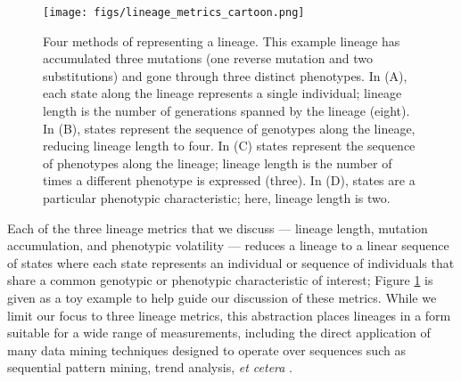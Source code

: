 \documentclass[letterpaper]{article}
\newcommand{\reduceCaptionPadding}{\setlength{\belowcaptionskip}{-10pt}}
\begin{document}
\begin{figure}[t]
\texttt{[image: figs/lineage\_metrics\_cartoon.png]}
\reduceCaptionPadding
\caption{\small Four methods of representing a lineage.  This example lineage has accumulated three mutations (one reverse mutation and two substitutions) and gone through three distinct phenotypes. In (A), each state along the lineage represents a single individual; lineage length is the number of generations spanned by the lineage (eight). In (B), states represent the sequence of genotypes along the lineage, reducing lineage length to four. In (C) states represent the sequence of phenotypes along the lineage; lineage length is the number of times a different phenotype is expressed (three). In (D), states are a particular phenotypic characteristic; here, lineage length is two.}
\label{fig:lineage_metrics_cartoon}
\end{figure}

Each of the three lineage metrics that we discuss --- lineage length, mutation accumulation, and phenotypic volatility --- reduces a lineage to a linear sequence of states where each state represents an individual or sequence of individuals that share a common genotypic or phenotypic characteristic of interest; Figure \ref{fig:lineage_metrics_cartoon} is given as a toy example to help guide our discussion of these metrics. 
While we limit our focus to three lineage metrics, this abstraction places lineages in a form suitable for a wide range of measurements, including the direct application of many data mining techniques designed to operate over sequences such as sequential pattern mining, trend analysis, \textit{et cetera} \citep{han2011data}. 
\end{document}
